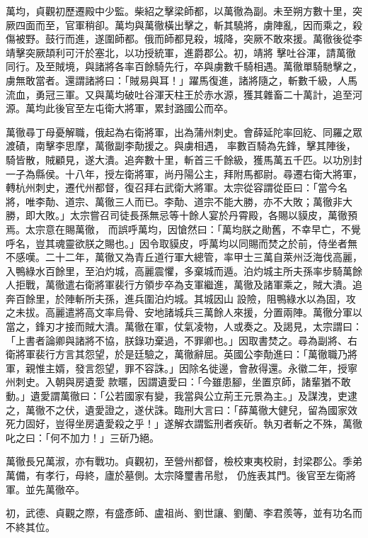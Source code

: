 \begin{pinyinscope}
 萬均，貞觀初歷遷殿中少監。柴紹之擊梁師都，以萬徹為副。未至朔方數十里，突厥四面而至，官軍稍卻。萬均與萬徹橫出擊之，斬其驍將，虜陣亂，因而乘之，殺傷被野。鼓行而進，遂圍師都。俄而師都見殺，城降，突厥不敢來援。萬徹後從李靖擊突厥頡利可汗於塞北，以功授統軍，進爵郡公。初，靖將
 擊吐谷渾，請萬徹同行。及至賊境，與諸將各率百餘騎先行，卒與虜數千騎相遇。萬徹單騎馳擊之，虜無敢當者。還謂諸將曰：「賊易與耳！」躍馬復進，諸將隨之，斬數千級，人馬流血，勇冠三軍。又與萬均破吐谷渾天柱王於赤水源，獲其雜畜二十萬計，追至河源。萬均此後官至左屯衛大將軍，累封潞國公而卒。



 萬徹尋丁母憂解職，俄起為右衛將軍，出為蒲州刺史。會薛延陀率回紇、同羅之眾渡磧，南擊李思摩，萬徹副李勣援之。與虜相遇，
 率數百騎為先鋒，擊其陣後，騎皆散，賊顧見，遂大潰。追奔數十里，斬首三千餘級，獲馬萬五千匹。以功別封一子為縣侯。十八年，授左衛將軍，尚丹陽公主，拜附馬都尉。尋遷右衛大將軍，轉杭州刺史，遷代州都督，復召拜右武衛大將軍。太宗從容謂從臣曰：「當今名將，唯李勣、道宗、萬徹三人而已。李勣、道宗不能大勝，亦不大敗；萬徹非大勝，即大敗。」太宗嘗召司徒長孫無忌等十餘人宴於丹霄殿，各賜以貘皮，萬徹預焉。太宗意在賜萬徹，
 而誤呼萬均，因愴然曰：「萬均朕之勛舊，不幸早亡，不覺呼名，豈其魂靈欲朕之賜也。」因令取貘皮，呼萬均以同賜而焚之於前，侍坐者無不感嘆。二十二年，萬徹又為青丘道行軍大總管，率甲士三萬自萊州泛海伐高麗，入鴨綠水百餘里，至泊灼城，高麗震懼，多棄城而遁。泊灼城主所夫孫率步騎萬餘人拒戰，萬徹遣右衛將軍裴行方領步卒為支軍繼進，萬徹及諸軍乘之，賊大潰。追奔百餘里，於陣斬所夫孫，進兵圍泊灼城。其城因山
 設險，阻鴨綠水以為固，攻之未拔。高麗遣將高文率烏骨、安地諸城兵三萬餘人來援，分置兩陣。萬徹分軍以當之，鋒刃才接而賊大潰。萬徹在軍，仗氣凌物，人或奏之。及謁見，太宗謂曰：「上書者論卿與諸將不協，朕錄功棄過，不罪卿也。」因取書焚之。尋為副將、右衛將軍裴行方言其怨望，於是廷驗之，萬徹辭屈。英國公李勣進曰：「萬徹職乃將軍，親惟主婿，發言怨望，罪不容誅。」因除名徙邊，會赦得還。永徽二年，授寧州刺史。入朝與房遺愛
 款暱，因謂遺愛曰：「今雖患腳，坐置京師，諸輩猶不敢動。」遺愛謂萬徹曰：「公若國家有變，我當與公立荊王元景為主。」及謀洩，吏逮之，萬徹不之伏，遺愛證之，遂伏誅。臨刑大言曰：「薛萬徹大健兒，留為國家效死力固好，豈得坐房遺愛殺之乎！」遂解衣謂監刑者疾斫。執刃者斬之不殊，萬徹叱之曰：「何不加力！」三斫乃絕。



 萬徹長兄萬淑，亦有戰功。貞觀初，至營州都督，檢校東夷校尉，封梁郡公。季弟萬備，有孝行，母終，廬於墓側。太宗降璽書吊慰，
 仍旌表其門。後官至左衛將軍。並先萬徹卒。



 初，武德、貞觀之際，有盛彥師、盧祖尚、劉世讓、劉蘭、李君羨等，並有功名而不終其位。




\end{pinyinscope}
